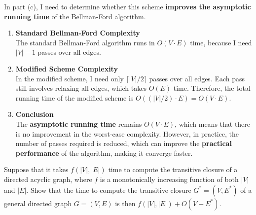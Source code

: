 \documentclass[10pt,letter,notitlepage]{article}
\newcounter{exercise}
\begin{document}
\begin{Answer}
In part (c), I need to determine whether this scheme \textbf{improves the asymptotic running time} of the Bellman-Ford algorithm.

\begin{enumerate}
    \item \textbf{Standard Bellman-Ford Complexity} \\
    The standard Bellman-Ford algorithm runs in \textbf{\( O(V \cdot E) \)} time, because I need \( |V| - 1 \) passes over all edges.

    \item \textbf{Modified Scheme Complexity} \\
    In the modified scheme, I need only \(\lceil |V| / 2 \rceil\) passes over all edges.
    Each pass still involves relaxing all edges, which takes \textbf{\( O(E) \)} time.
    Therefore, the total running time of the modified scheme is \textbf{\( O((|V| / 2) \cdot E) = O(V \cdot E) \)}.

    \item \textbf{Conclusion} \\
    The \textbf{asymptotic running time} remains \textbf{\( O(V \cdot E) \)}, which means that there is no improvement in the worst-case complexity.
    However, in practice, the number of passes required is reduced, which can improve the \textbf{practical performance} of the algorithm, making it converge faster.
\end{enumerate}



\end{Answer}


\begin{exercise}[(17 marks)]

Suppose that it takes $f(|V|, |E|)$ time to compute the transitive closure of a directed acyclic graph, where $f$ is a monotonically increasing function of both $|V|$ and $|E|$. Show that the time to compute the transitive closure $G^* = (V, E^*)$ of a general directed graph $G = (V, E)$ is then $f(|V|, |E|) + O(V + E^*)$.
\end{exercise}
\end{document}
